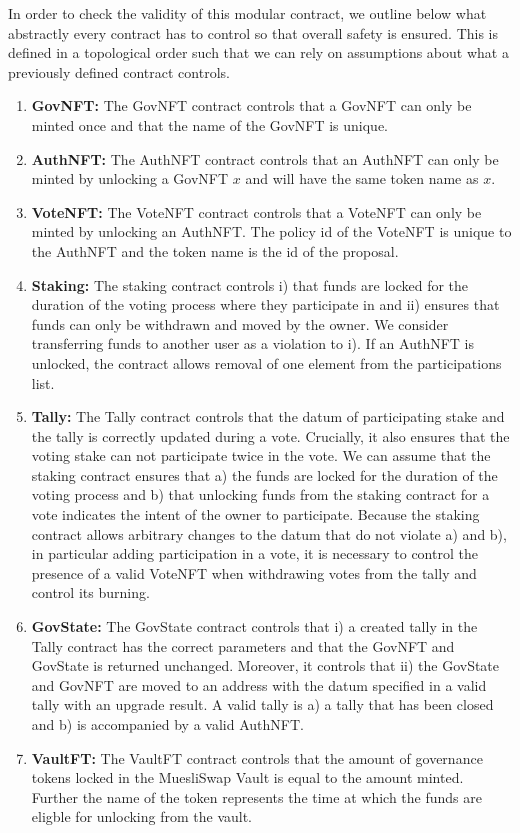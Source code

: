 \documentclass[11pt]{article}
\begin{document}
In order to check the validity of this modular contract, we outline below what abstractly every contract has to control so that overall safety is ensured.
This is defined in a topological order such that we can rely on assumptions about what a previously defined contract controls.

\begin{enumerate}
    \item \textbf{GovNFT:} The GovNFT contract controls that a GovNFT can only be minted once and that the name of the GovNFT is unique.
    \item \textbf{AuthNFT:} The AuthNFT contract controls that an AuthNFT can only be minted by unlocking a GovNFT $x$ and will have the same token name as $x$.
    \item \textbf{VoteNFT:} The VoteNFT contract controls that a VoteNFT can only be minted by unlocking an AuthNFT. The policy id of the VoteNFT is unique to the AuthNFT and the token name is the id of the proposal.
    \item \textbf{Staking:} The staking contract controls i) that funds are locked for the duration of the voting process where they participate in and ii) ensures that funds can only be withdrawn and moved by the owner. We consider transferring funds to another user as a violation to i). If an AuthNFT is unlocked, the contract allows removal of one element from the participations list.
    \item \textbf{Tally:} The Tally contract controls that the datum of participating stake and the tally is correctly updated during a vote. Crucially, it also ensures that the voting stake can not participate twice in the vote.
    We can assume that the staking contract ensures that a) the funds are locked for the duration of the voting process and b) that unlocking funds from the staking contract for a vote indicates the intent of the owner to participate.
    Because the staking contract allows arbitrary changes to the datum that do not violate a) and b), in particular adding participation in a vote, it is necessary to control the presence of a valid VoteNFT when withdrawing votes from the tally and control its burning.
    \item \textbf{GovState:} The GovState contract controls that i) a created tally in the Tally contract has the correct parameters and that the GovNFT and GovState is returned unchanged.
    Moreover, it controls that ii) the GovState and GovNFT are moved to an address with the datum specified in a valid tally with an upgrade result.
    A valid tally is a) a tally that has been closed and b) is accompanied by a valid AuthNFT.
    \item \textbf{VaultFT:} The VaultFT contract controls that the amount of governance tokens locked in the MuesliSwap Vault is equal to the amount minted. Further the name of the token represents the time at which the funds are eligble for unlocking from the vault.
\end{enumerate}
\end{document}
